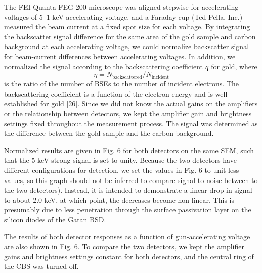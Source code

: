 \documentclass{article}
\begin{document}
The FEI Quanta FEG 200 microscope was aligned stepwise for accelerating voltages of 5–1-keV accelerating voltage, and a Faraday cup (Ted Pella, Inc.) measured the beam current at a fixed spot size for each voltage. By integrating the backscatter signal difference for the same area of the gold sample and carbon background at each accelerating voltage, we could normalize backscatter signal for beam-current differences between accelerating voltages. In addition, we normalized the signal according to the backscattering coefficient \emph{η} for gold, where
\begin{equation}
\eta = N_{\mathrm{backscattered}}/N_{\mathrm{incident}} \tag{2}
\end{equation}
is the ratio of the number of BSEs to the number of incident electrons. The backscattering coefficient is a function of the electron energy and is well established for gold [26]. Since we did not know the actual gains on the amplifiers or the relationship between detectors, we kept the amplifier gain and brightness settings fixed throughout the measurement process. The signal was determined as the difference between the gold sample and the carbon background.

Normalized results are given in Fig. 6 for both detectors on the same SEM, such that the 5-keV strong signal is set to unity. Because the two detectors have different configurations for detection, we set the values in Fig. 6 to unit-less values, so this graph should not be inferred to compare signal to noise between to the two detectors). Instead, it is intended to demonstrate a linear drop in signal to about 2.0 keV, at which point, the decreases become non-linear. This is presumably due to less penetration through the surface passivation layer on the silicon diodes of the Gatan BSD.

The results of both detector responses as a function of gun-accelerating voltage are also shown in Fig. 6. To compare the two detectors, we kept the amplifier gains and brightness settings constant for both detectors, and the central ring of the CBS was turned off.
\end{document}
